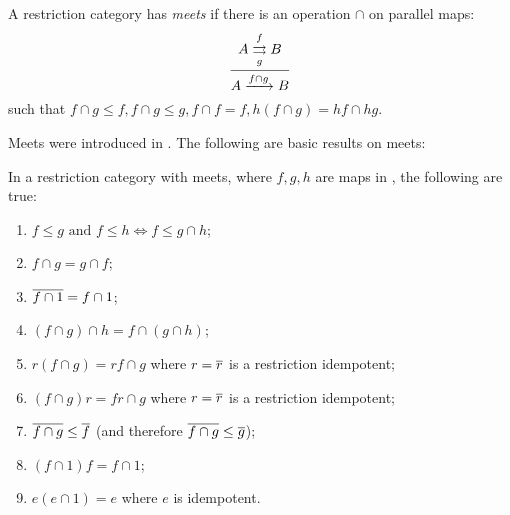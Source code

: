 \begin{definition}
  A restriction category has \emph{meets} if there is an operation $\cap$ on parallel maps:
  \[
    \infer{A\xrightarrow{f\cap g} B}
      {A\overset{f}{\underset{g}{\rightrightarrows}}B}
  \]
  such that $f\cap g \le f, f\cap g \le g, f\cap f = f, h (f\cap g) = h f \cap hg$.
\end{definition}

Meets were introduced in \cite{cockett-guo-hofstra-2012:range2}.
The following are basic results on meets:

\begin{lemma}
  \label{lem:properties_of_meets_in_restriction_categories}
  In a restriction category \X with meets, where $f, g, h$ are maps in
  \X, the following are true:
  \begin{enumerate}[{(}i{)}]
    \item $f\le g \text{ and } f \le h \iff f \le g\cap h$; 
        \label{lemsub:properties_of_meets_one}
    \item $f\cap g = g \cap f$;\label{lemsub:properties_of_meets_two}
    \item $\overline{f\cap 1} = f \cap 1$;\label{lemsub:properties_of_meets_three}
    \item $(f \cap g) \cap h = f \cap (g \cap h)$;
    \item $r(f\cap g) = r f \cap g$ where $r=\overline{r}$ is a restriction idempotent;
    \item $(f\cap g)r = f r \cap g$ where $r=\overline{r}$ is a restriction idempotent;
    \item $\overline{f\cap g} \le \overline{f}$ (and therefore $\overline{f\cap g} \le \overline{g}$);
    \item $ (f \cap 1) f = f \cap 1$;
    \item $ e(e \cap 1) = e$ where $e$ is idempotent.
  \end{enumerate}
\end{lemma}
